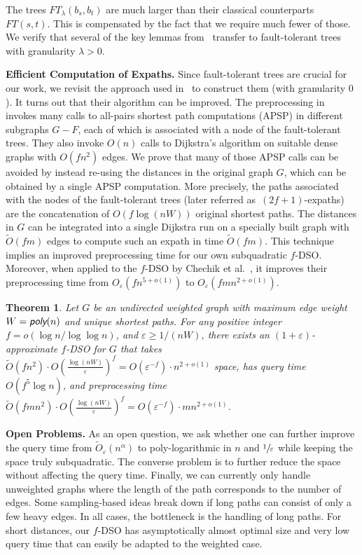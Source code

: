 \documentclass{article}\usepackage[a4paper,margin=20mm]{geometry}
\newtheorem{theorem}{Theorem}\newtheorem{lemma}[theorem]{Lemma}\newtheorem{proposition}[theorem]{Proposition}\newtheorem{corollary}[theorem]{Corollary}\newtheorem{definition}[theorem]{Definition}\newtheorem{claim}[theorem]{Claim}\newtheorem{remark}[theorem]{Remark}\newtheorem{observation}[theorem]{Observation}\newtheorem{conjecture}[theorem]{Conjecture}\newtheorem{example}[theorem]{Example}
\newcommand*{\Otilde}{\widetilde{O}}
\newcommand*{\poly}{\textsf{poly}}
\renewcommand{\ge}{\geqslant}
\newcommand{\eps}{\varepsilon}
\begin{document}
The trees $FT_\lambda(b_s, b_t)$ are much larger than their classical counterparts $FT(s,t)$.
This is compensated by the fact that we require much fewer of those. 
We verify that several of the key lemmas from~\cite{ChCoFiKa17} transfer to 
fault-tolerant trees with granularity $\lambda >0$. 
\vspace*{.5em}

\noindent
\textbf{Efficient Computation of Expaths.}
Since fault-tolerant trees are crucial for our work,
we revisit the approach used in~\cite{ChCoFiKa17} to construct them (with granularity $0$).
It turns out that their algorithm can be improved. 
The preprocessing in~\cite{ChCoFiKa17} invokes many calls to all-pairs shortest path computations (APSP) in different subgraphs $G-F$, each of which is associated with a node of the fault-tolerant trees. 
They also invoke $O(n)$ calls to Dijkstra's algorithm on suitable dense graphs with $O(fn^2)$ edges. 
We prove that many of those APSP calls can be avoided by instead re-using the distances in the original graph $G$, which can be obtained by a single APSP computation.
More precisely, the paths associated with the nodes of the fault-tolerant trees
(later referred as~$(2f+1)$-expaths) are the concatenation of $O(f \log (nW))$ original shortest paths.
The distances in $G$ can be integrated into a single Dijkstra run on a specially built graph with $\Otilde(fm)$ edges to compute such an expath in time $\Otilde(fm)$.
This technique implies an improved preprocessing time for our own subquadratic $f$-DSO.
Moreover, when applied to the $f$-DSO by Chechik et al.~\cite{ChCoFiKa17}, it improves their preprocessing time from $O_\varepsilon(fn^{5+o(1)})$ to $O_\varepsilon(fmn^{2+o(1)})$. 

\begin{theorem}
\label{thm:improved_preprocessing}
  Let $G$ be an undirected weighted graph with maximum edge weight $W = \emph{\poly}(n)$
  and unique shortest paths.
  For any positive integer $f = o(\log n/\log\log n)$,
  and $\varepsilon \ge 1/(nW)$,
  there exists an $(1{+}\varepsilon)$-approximate $f$-DSO for $G$ that takes
  $\Otilde(fn^2) \cdot O\!\left(\frac{\log(nW)}{\varepsilon}\right)^f 
    = O(\varepsilon^{-f}) \cdot n^{2+o(1)}$ space,
  has query time $O(f^5 \log n)$,
  and preprocessing time 
  $\Otilde(fmn^2) \cdot O\!\left(\frac{\log(nW)}{\varepsilon}\right)^f 
  	= O(\varepsilon^{-f}) \cdot mn^{2+o(1)}$.
\end{theorem} 

\noindent
\textbf{Open Problems.}
As an open question, we ask whether one can further improve the query time from 
$\Otilde_\eps(n^\alpha)$ to poly-logarithmic in $n$ and $\sfrac{1}{\eps}$ 
while keeping the space truly subquadratic.
The converse problem is to further reduce the space without affecting the query time.
Finally, we can currently only handle unweighted graphs
where the length of the path corresponds to the number of edges.
Some sampling-based ideas break down if long paths can consist of only a few heavy edges.
In all cases, the bottleneck is the handling of long paths.
For short distances, our $f$-DSO has asymptotically almost optimal size and very low query time that can easily be adapted to the weighted case.
\end{document}
